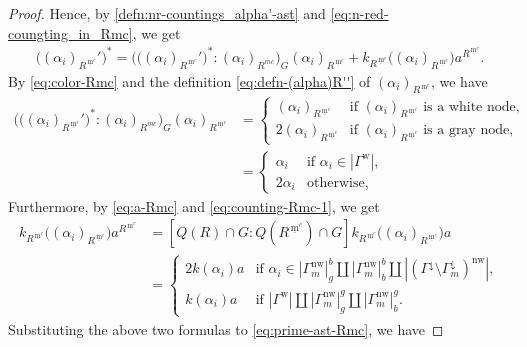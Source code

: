 \documentclass[11pt]{amsart}
\newcommand{\mc}{\, \underline{\mathrm{m}}^c}
\newcommand{\w}{\mathrm{w}}
\newcommand{\nw}{\mathrm{nw}}
\begin{document}
{\begin{proof}
Hence, by \eqref{defn:nr-countings_alpha'-ast} and \eqref{eq:n-red-coungting_in_Rmc},
we get 
\begin{equation}\label{eq:prime-ast-Rmc}
\begin{aligned}
\big((\alpha_i)_{R^{\mc}}'\big)^*=
\big(\big((\alpha_i)_{R^{\mc}}'\big)^*:(\alpha_i)_{R^{mc}}\big)_G(\alpha_i)_{R^{\mc}}
+k_{R^{\mc}}\big((\alpha_i)_{R^{\mc}}\big)a^{R^{\mc}}.
\end{aligned}
\end{equation}
By \eqref{eq:color-Rmc} and the definition \eqref{eq:defn-(alpha)R''} 
of $(\alpha_i)_{R^{\mc}}$, we have
\begin{align*}
\big(\big((\alpha_i)_{R^{\mc}}'\big)^*:(\alpha_i)_{R^{mc}}\big)_G(\alpha_i)_{R^{\mc}}
&=\begin{cases}
(\alpha_i)_{R^{\mc}} & \text{if $(\alpha_i)_{R^{\mc}}$ is a white node},\\
2(\alpha_i)_{R^{\mc}} & \text{if $(\alpha_i)_{R^{\mc}}$ is a gray node},
\end{cases}\\
&=\begin{cases}
\alpha_i & \text{if $\alpha_i\in |\Gamma^\w|$},\\
2\alpha_i & \text{otherwise},
\quad 
\end{cases}
\end{align*}
Furthermore, by \eqref{eq:a-Rmc} and \eqref{eq:counting-Rmc-1}, we get 
\begin{align*}
k_{R^{\mc}}\big((\alpha_i)_{R^{\mc}}\big)a^{R^{\mc}} 
&=[Q(R)\cap G:Q(R^{\mc})\cap G]k_{R^{\mc}}\big((\alpha_i)_{R^{\mc}}\big)a\\
&=\begin{cases}
2k(\alpha_i)a & \text{if $\alpha_i\in 
|\Gamma_m^\nw|_g^b
\amalg |\Gamma_m^\nw|_b^b\amalg 
|(\Gamma^{\downarrow}\setminus 
\Gamma_m^{\downarrow})^\nw|$},\\
k(\alpha_i)a & \text{if $|\Gamma^\w|\amalg 
|\Gamma_m^\nw|_g^g\amalg |\Gamma_m^\nw|_b^g$}.
\end{cases}
\end{align*}
Substituting the above two formulas to \eqref{eq:prime-ast-Rmc}, we have

\end{proof}}
\end{document}
